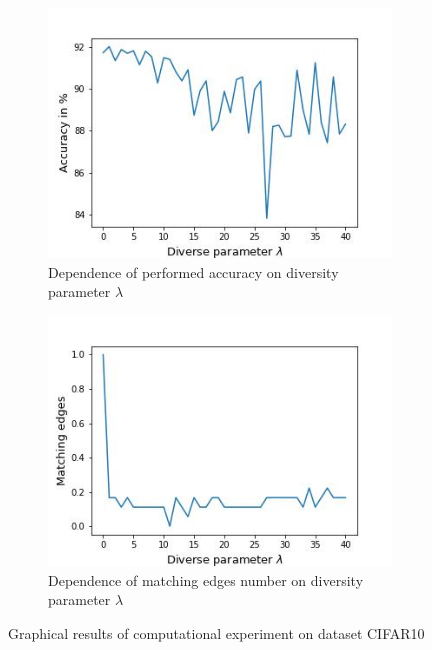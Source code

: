 \documentclass{article}
\begin{document}
\begin{figure}[H]
	\centering
	\begin{subfigure}{.46\textwidth}
        \centering
	    \includegraphics[width=1\linewidth]{fig2CIFAR}
	  \caption{Dependence of performed accuracy on diversity parameter $\lambda$}
	  \label{fig:graph1CIFAR}
	\end{subfigure}%
    \hspace{1cm}
	\begin{subfigure}{.46\textwidth}
	  \centering
	  \includegraphics[width=1\linewidth]{fig3CIFAR}
	  \caption{Dependence of matching edges number on diversity parameter $\lambda$}
	  \label{fig:graph2CIFAR}
	\end{subfigure}
	\caption{Graphical results of computational experiment on dataset CIFAR10}
	\label{fig:graphCIFAR}
\end{figure}
\end{document}
